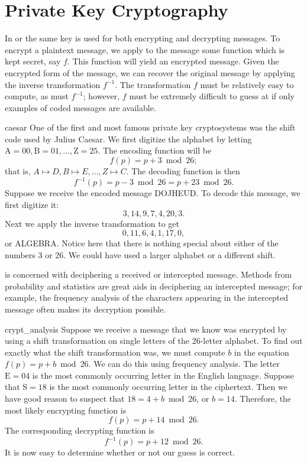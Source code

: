 \section{Private Key Cryptography}
 
In  or
the same key is used for both encrypting and decrypting messages. To
encrypt a  plaintext message, we apply to the message some function
which is kept secret, say $f$. This function will yield an encrypted
message.  Given the encrypted form of the message, we can recover the
original message by applying the inverse transformation $f^{-1}$. The
transformation $f$ must be relatively easy to compute, as must
$f^{-1}$; however, $f$ must be extremely difficult to guess at if only
examples of coded messages are available.
 
\begin{example}{caesar}
One of the first and most famous private key cryptosystems was the
shift code used by Julius Caesar.  We first digitize the alphabet by
letting $\mbox{A}  = 00, \mbox{B}  = 01, \ldots, \mbox{Z} = 25$.
The encoding function will be 
\[
f(p) = p + 3 \bmod 26;
\]
that is, $A \mapsto D, B \mapsto E, \ldots, Z \mapsto C$. The decoding
function is then 
\[
f^{-1}(p) = p - 3 \bmod 26 = p + 23 \bmod 26.
\]
Suppose we receive the encoded message DOJHEUD. To decode this
message, we first digitize it:  
\[
3, 14, 9, 7, 4, 20, 3.
\]
Next we apply the inverse transformation to get
\[
0, 11, 6, 4, 1, 17, 0,
\]
or ALGEBRA. Notice here that there is nothing special about either of
the numbers 3 or 26. We could have used a larger alphabet or a
different shift.
\mbox{\hspace{1in}}
\end{example}

 
 is concerned with
deciphering a received or intercepted message. Methods from
probability and statistics are great aids in deciphering an
intercepted message; for example, the frequency analysis of the
characters appearing in the intercepted message often makes its
decryption possible.  
 
 
\begin{example}{crypt_analysis}
Suppose we receive a message that we know was encrypted by using a
shift transformation on single letters of the 26-letter alphabet. To
find out exactly what the shift transformation was, we must compute
$b$ in the equation $f(p) = p + b \bmod 26$. We can do this using
frequency analysis.  The letter $\mbox{E} = 04$ is the most commonly
occurring letter in the English language. Suppose that $\mbox{S} = 18$
is the most commonly occurring letter in the ciphertext.  Then we have
good reason to suspect that  $18 = 4 + b \bmod 26$, or $b= 14$.
Therefore, the most likely encrypting function is
\[
f(p) = p + 14 \bmod 26.
\]
The corresponding decrypting function is
\[
f^{-1}(p) = p + 12 \bmod 26.
\]
It is now easy to determine whether or not our guess is correct.
\end{example}
 
